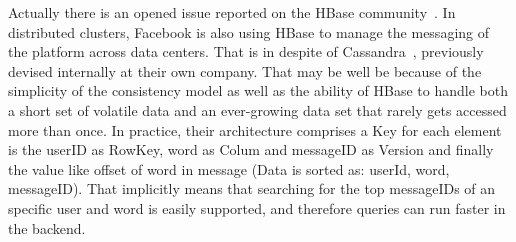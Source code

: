 Actually there is an opened issue reported on the HBase community~\cite{JIRA-1}. In distributed clusters, Facebook is also using HBase to manage the messaging of the platform across data centers. That is in despite of Cassandra~\cite{FacebookHBase}, previously devised internally at their own company. That may be well be because of the simplicity of the consistency model as well as the ability of HBase to handle both a short set of volatile data and an ever-growing data set that rarely gets accessed more than once. In practice, their architecture comprises a Key for each element is the userID as RowKey, word as Colum and messageID as Version and finally the value like offset of word in message (Data is sorted as: userId, word, messageID). That implicitly means that searching for the top messageIDs of an specific user and word is easily supported, and therefore queries can run faster in the backend.





